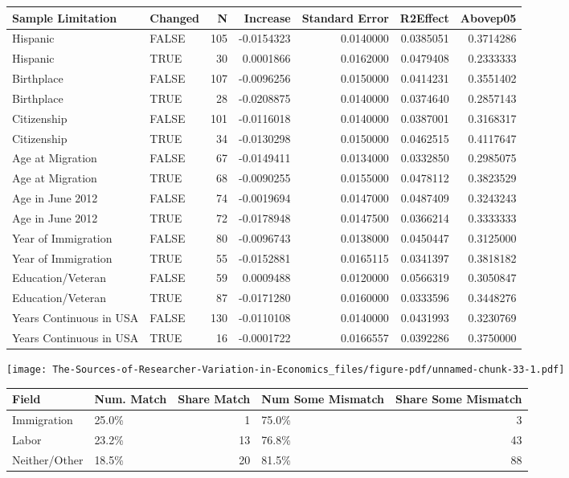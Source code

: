 \documentclass[
  letterpaper,
  DIV=11,
  numbers=noendperiod]{scrartcl}
\begin{document}
\begin{tabular}{llrrrrr}
\toprule
Sample Limitation & Changed & N & Increase & Standard Error & R2Effect & Abovep05\\
\midrule
Hispanic & FALSE & 105 & -0.0154323 & 0.0140000 & 0.0385051 & 0.3714286\\
Hispanic & TRUE & 30 & 0.0001866 & 0.0162000 & 0.0479408 & 0.2333333\\
Birthplace & FALSE & 107 & -0.0096256 & 0.0150000 & 0.0414231 & 0.3551402\\
Birthplace & TRUE & 28 & -0.0208875 & 0.0140000 & 0.0374640 & 0.2857143\\
Citizenship & FALSE & 101 & -0.0116018 & 0.0140000 & 0.0387001 & 0.3168317\\
\addlinespace
Citizenship & TRUE & 34 & -0.0130298 & 0.0150000 & 0.0462515 & 0.4117647\\
Age at Migration & FALSE & 67 & -0.0149411 & 0.0134000 & 0.0332850 & 0.2985075\\
Age at Migration & TRUE & 68 & -0.0090255 & 0.0155000 & 0.0478112 & 0.3823529\\
Age in June 2012 & FALSE & 74 & -0.0019694 & 0.0147000 & 0.0487409 & 0.3243243\\
Age in June 2012 & TRUE & 72 & -0.0178948 & 0.0147500 & 0.0366214 & 0.3333333\\
\addlinespace
Year of Immigration & FALSE & 80 & -0.0096743 & 0.0138000 & 0.0450447 & 0.3125000\\
Year of Immigration & TRUE & 55 & -0.0152881 & 0.0165115 & 0.0341397 & 0.3818182\\
Education/Veteran & FALSE & 59 & 0.0009488 & 0.0120000 & 0.0566319 & 0.3050847\\
Education/Veteran & TRUE & 87 & -0.0171280 & 0.0160000 & 0.0333596 & 0.3448276\\
Years Continuous in USA & FALSE & 130 & -0.0110108 & 0.0140000 & 0.0431993 & 0.3230769\\
\addlinespace
Years Continuous in USA & TRUE & 16 & -0.0001722 & 0.0166557 & 0.0392286 & 0.3750000\\
\bottomrule
\end{tabular}

\texttt{[image: The-Sources-of-Researcher-Variation-in-Economics\_files/figure-pdf/unnamed-chunk-33-1.pdf]}

\begin{tabular}{llrlr}
\toprule
Field & Num. Match & Share Match & Num Some Mismatch & Share Some Mismatch\\
\midrule
Immigration & 25.0\% & 1 & 75.0\% & 3\\
Labor & 23.2\% & 13 & 76.8\% & 43\\
Neither/Other & 18.5\% & 20 & 81.5\% & 88\\
\bottomrule
\end{tabular}
\end{document}
